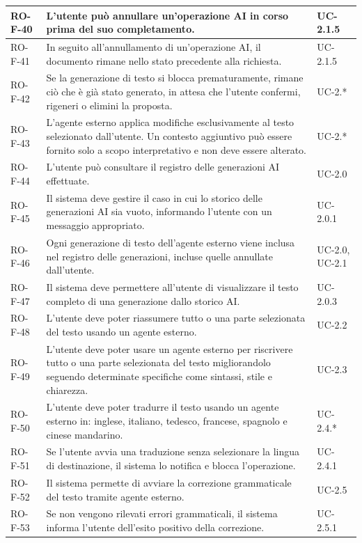 \documentclass[11pt,a4paper]{article}
\begin{document}
\begin{longtable}{|p{}|>{\raggedright\arraybackslash}p{}|p{}|}
\hline
RO-F-40 & L'utente può annullare un'operazione AI in corso prima del suo completamento. & UC-2.1.5 \\
\hline
RO-F-41 & In seguito all'annullamento di un'operazione AI, il documento rimane nello stato precedente alla richiesta. & UC-2.1.5 \\
\hline
RO-F-42 & Se la generazione di testo si blocca prematuramente, rimane ciò che è già stato generato, in attesa che l'utente confermi, rigeneri o elimini la proposta. & UC-2.* \\
\hline
RO-F-43 & L'agente esterno applica modifiche esclusivamente al testo selezionato dall'utente. Un contesto aggiuntivo può essere fornito solo a scopo interpretativo e non deve essere alterato. & UC-2.* \\
\hline
RO-F-44 & L'utente può consultare il registro delle generazioni AI effettuate. & UC-2.0 \\
\hline
RO-F-45 & Il sistema deve gestire il caso in cui lo storico delle generazioni AI sia vuoto, informando l'utente con un messaggio appropriato. & UC-2.0.1 \\
\hline
RO-F-46 & Ogni generazione di testo dell'agente esterno viene inclusa nel registro delle generazioni, incluse quelle annullate dall'utente. & UC-2.0, UC-2.1 \\
\hline
RO-F-47 & Il sistema deve permettere all'utente di visualizzare il testo completo di una generazione dallo storico AI. & UC-2.0.3 \\
\hline
RO-F-48 & L'utente deve poter riassumere tutto o una parte selezionata del testo usando un agente esterno. & UC-2.2 \\
\hline
RO-F-49 & L'utente deve poter usare un agente esterno per riscrivere tutto o una parte selezionata del testo migliorandolo seguendo determinate specifiche come sintassi, stile e chiarezza. & UC-2.3 \\
\hline
RO-F-50 & L'utente deve poter tradurre il testo usando un agente esterno in: inglese, italiano, tedesco, francese, spagnolo e cinese mandarino. & UC-2.4.* \\
\hline
RO-F-51 & Se l'utente avvia una traduzione senza selezionare la lingua di destinazione, il sistema lo notifica e blocca l'operazione. & UC-2.4.1 \\
\hline
RO-F-52 & Il sistema permette di avviare la correzione grammaticale del testo tramite agente esterno. & UC-2.5 \\
\hline
RO-F-53 & Se non vengono rilevati errori grammaticali, il sistema informa l'utente dell'esito positivo della correzione. & UC-2.5.1 \\

\end{longtable}
\end{document}
